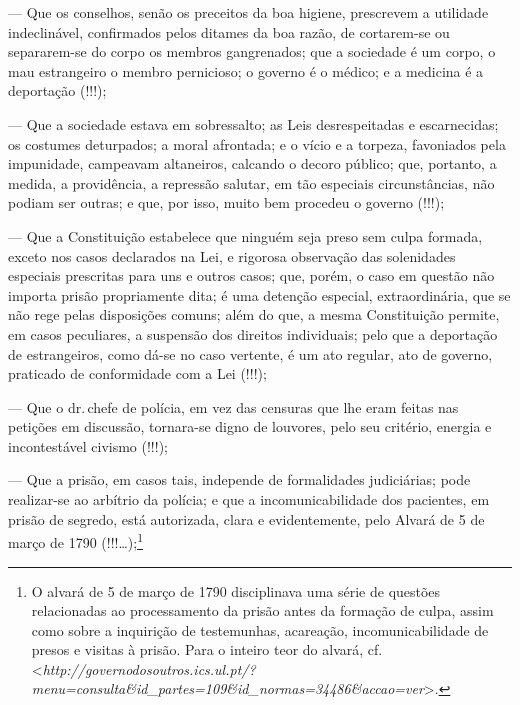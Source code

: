 --- Que os conselhos, senão os preceitos da boa higiene, prescrevem a
  utilidade indeclinável, confirmados pelos ditames da boa razão, de
  cortarem-se ou separarem-se do corpo os membros gangrenados; que a
  sociedade é um corpo, o mau estrangeiro o membro pernicioso; o governo
  é o médico; e a medicina é a deportação (!!!);

--- Que a sociedade estava em sobressalto; as Leis desrespeitadas e
  escarnecidas; os costumes deturpados; a moral afrontada; e o vício e a
  torpeza, favoniados pela impunidade, campeavam altaneiros, calcando o
  decoro público; que, portanto, a medida, a providência, a repressão
  salutar, em tão especiais circunstâncias, não podiam ser
  outras; e que, por isso, muito bem procedeu o governo (!!!);

--- Que a Constituição estabelece que ninguém seja preso sem culpa
  formada, exceto nos casos declarados na Lei, e rigorosa observação das
  solenidades especiais prescritas para uns e outros casos; que, porém,
  o caso em questão não importa prisão propriamente dita; é uma detenção
  especial, extraordinária, que se não rege pelas disposições comuns;
  além do que, a mesma Constituição permite, em casos peculiares, a
  suspensão dos direitos individuais; pelo que a deportação de
  estrangeiros, como dá-se no caso vertente, é um ato regular, ato de
  governo, praticado de conformidade com a Lei (!!!);

--- Que o dr.\,chefe de polícia, em vez das censuras que lhe eram feitas
  nas petições em discussão, tornara-se digno de louvores, pelo seu
  critério, energia e incontestável civismo (!!!);

--- Que a prisão, em casos tais, independe de formalidades judiciárias;
  pode realizar-se ao arbítrio da polícia; e que a incomunicabilidade
  dos pacientes, em prisão de segredo, está autorizada, clara e
  evidentemente, pelo Alvará de 5 de março de 1790 (!!!\ldots{});\footnote{
    O alvará de 5 de março de 1790 disciplinava uma série de questões
    relacionadas ao processamento da prisão antes da formação de culpa,
    assim como sobre a inquirição de testemunhas, acareação,
    incomunicabilidade de presos e visitas à prisão. Para o inteiro teor
    do alvará, cf.
    \textless{}\emph{http://governodosoutros.ics.ul.pt/?menu=consulta\&id\_partes=109\&id\_normas=34486\&accao=ver}\textgreater{}.}

